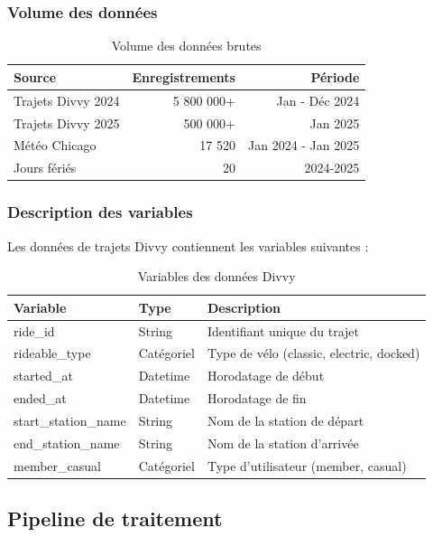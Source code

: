 \documentclass[12pt,a4paper]{article}
\begin{document}
\subsubsection{Volume des données}

\begin{table}[H]
\centering
\caption{Volume des données brutes}
\label{tab:data_volume}
\begin{tabular}{lrr}
\toprule
\textbf{Source} & \textbf{Enregistrements} & \textbf{Période} \\
\midrule
Trajets Divvy 2024 & 5 800 000+ & Jan - Déc 2024 \\
Trajets Divvy 2025 & 500 000+ & Jan 2025 \\
Météo Chicago & 17 520 & Jan 2024 - Jan 2025 \\
Jours fériés & 20 & 2024-2025 \\
\bottomrule
\end{tabular}
\end{table}

\subsubsection{Description des variables}

Les données de trajets Divvy contiennent les variables suivantes :

\begin{table}[H]
\centering
\caption{Variables des données Divvy}
\label{tab:divvy_vars}
\begin{tabular}{llp{6cm}}
\toprule
\textbf{Variable} & \textbf{Type} & \textbf{Description} \\
\midrule
ride\_id & String & Identifiant unique du trajet \\
rideable\_type & Catégoriel & Type de vélo (classic, electric, docked) \\
started\_at & Datetime & Horodatage de début \\
ended\_at & Datetime & Horodatage de fin \\
start\_station\_name & String & Nom de la station de départ \\
end\_station\_name & String & Nom de la station d'arrivée \\
member\_casual & Catégoriel & Type d'utilisateur (member, casual) \\
\bottomrule
\end{tabular}
\end{table}

\subsection{Pipeline de traitement}
\end{document}
